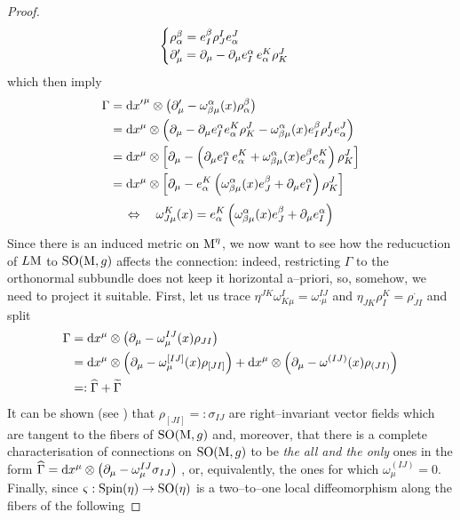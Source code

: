 \begin{proof}
    $$\begin{cases}
        \rho^\beta_\alpha=e^\beta_I\rho^I_Je^J_\alpha\\
        \partial_\mu'=\partial_\mu-\partial_\mu e^\alpha_I\,e^K_\alpha\rho^J_K
    \end{cases}$$
    which then imply
    \begin{align*}
        \Gamma&=\text{\normalfont d}{x'}^\mu\otimes\left(\partial_\mu'-\omega^\alpha_{\beta\mu}(x)\rho^\beta_\alpha\right)\\
        &=\text{\normalfont d} x^\mu\otimes\left(\partial_\mu-\partial_\mu e^\alpha_I e^K_\alpha \rho^J_K-\omega^\alpha_{\beta\mu}(x)e^\beta_I\rho^I_Je^J_\alpha\right)\\
        &=\text{\normalfont d} x^\mu\otimes\left[\partial_\mu-\left(\partial_\mu e^\alpha_I\,e^K_\alpha+\omega^\alpha_{\beta\mu}(x)e^\beta_Je^K_\alpha\right)\rho^J_K\right]\\
        &=\text{\normalfont d} x^\mu\otimes\left[\partial_\mu-e^K_\alpha\left(\omega^\alpha_{\beta\mu}(x)e^\beta_J+\partial_\mu e^\alpha_I\right)\rho^J_K\right]
    \end{align*}
    $$\Leftrightarrow\quad\omega^K_{J\mu}(x)=e^K_\alpha\left(\omega^\alpha_{\beta\mu}(x)e^\beta_J+\partial_\mu e^\alpha_I\right)$$
    Since there is an induced metric on $\text{\normalfont M}^\eta$, we now want to see how the reducuction of $L\text{\normalfont M}$ to $\text{\normalfont SO}(\text{\normalfont M},g)$ affects the connection: indeed, restricting $\Gamma$ to the orthonormal subbundle does not keep it horizontal a--priori, so, somehow, we need to project it suitable. First, let us trace $\eta^{JK}\omega^I_{K\mu}=\omega^{IJ}_{\cdot\mu}$ and $\eta_{JK}\rho^K_I=\rho^\cdot_{JI}$ and split  
    \begin{align*}
        \Gamma&=\text{\normalfont d} x^\mu\otimes\left(\partial_\mu-\omega^{IJ}_\mu(x)\rho_{JI}\right)\\
        &=\text{\normalfont d} x^\mu\otimes\left(\partial_\mu-\omega^{[IJ]}_\mu(x)\rho_{[JI]}\right)+\text{\normalfont d} x^\mu\otimes\left(\partial_\mu-\omega^{(IJ)}(x)\rho_{(JI)}\right)\\
        &=:\widehat{\Gamma}+\widetilde{\Gamma}
    \end{align*}
    It can be shown (see \cite{fatib}) that $\rho_{[JI]}=:\sigma_{IJ}$ are right--invariant vector fields which are tangent to the fibers of $\text{\normalfont SO}(\text{\normalfont M},g)$ and, moreover, that there is a complete characterisation of connections on $\text{\normalfont SO}(\text{\normalfont M},g)$ to be \emph{the all and the only} ones in the form $\widehat{\Gamma}=\text{\normalfont d} x^\mu\otimes\left(\partial_\mu-\omega^{IJ}_\mu\sigma_{IJ}\right)$ , or, equivalently, the ones for which $\omega^{(IJ)}_\mu=0$. Finally, since $\varsigma:\text{\normalfont Spin}(\eta)\to\text{\normalfont SO}(\eta)$ is a two--to--one local diffeomorphism along the fibers of the following 

\end{proof}
